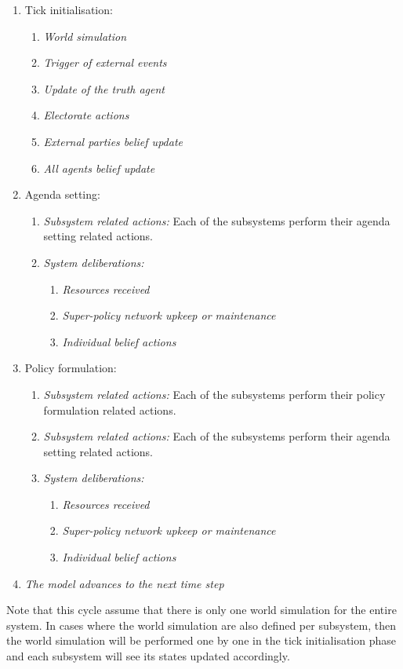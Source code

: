 \begin{enumerate}
\item Tick initialisation:
	\begin{enumerate}
	\item \emph{World simulation}
	\item \emph{Trigger of external events}
	\item \emph{Update of the truth agent}
	\item \emph{Electorate actions}
	\item \emph{External parties belief update}
	\item \emph{All agents belief update}
	\end{enumerate}
\item Agenda setting:
	\begin{enumerate}
	\item \emph{Subsystem related actions:} Each of the subsystems perform their agenda setting related actions.
	\item \emph{System deliberations:}
		\begin{enumerate}
		\item \emph{Resources received}
		\item \emph{Super-policy network upkeep or maintenance}
		\item \emph{Individual belief actions}
		\end{enumerate}
	\end{enumerate}
\item Policy formulation:
	\begin{enumerate}
	\item \emph{Subsystem related actions:} Each of the subsystems perform their policy formulation related actions.
	\item \emph{Subsystem related actions:} Each of the subsystems perform their agenda setting related actions.
	\item \emph{System deliberations:}
		\begin{enumerate}
		\item \emph{Resources received}
		\item \emph{Super-policy network upkeep or maintenance}
		\item \emph{Individual belief actions}
		\end{enumerate}
	\end{enumerate}
\item \emph{The model advances to the next time step}
\end{enumerate}

Note that this cycle assume that there is only one world simulation for the entire system. In cases where the world simulation are also defined per subsystem, then the world simulation will be performed one by one in the tick initialisation phase and each subsystem will see its states updated accordingly.
